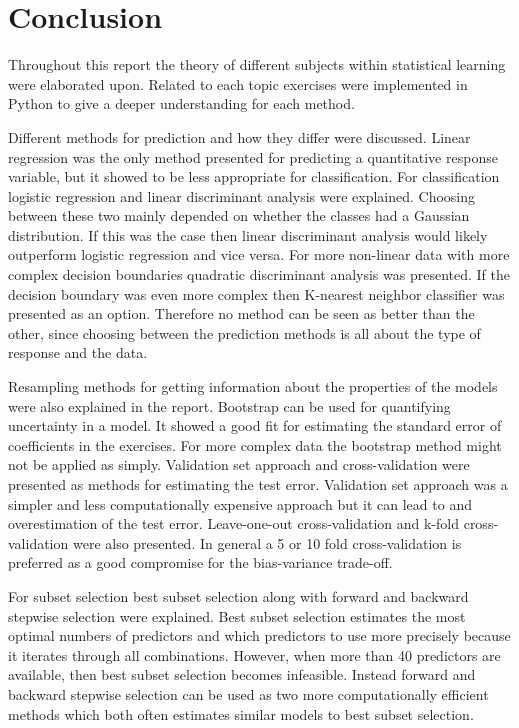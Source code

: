 \chapter{Conclusion}
\label{chp:conc}

Throughout this report the theory of different subjects within statistical learning were elaborated upon. Related to each topic exercises were implemented in Python to give a deeper understanding for each method. 

Different methods for prediction and how they differ were discussed. Linear regression was the only method presented for predicting a quantitative response variable, but it showed to be less appropriate for classification. For classification logistic regression and linear discriminant analysis were explained. Choosing between these two mainly depended on whether the classes had a Gaussian distribution. If this was the case then linear discriminant analysis would likely outperform logistic regression and vice versa. For more non-linear data with more complex decision boundaries quadratic discriminant analysis was presented. If the decision boundary was even more complex then K-nearest neighbor classifier was presented as an option. Therefore no method can be seen as better than the other, since choosing between the prediction methods is all about the type of response and the data.

Resampling methods for getting information about the properties of the models were also explained in the report. Bootstrap can be used for quantifying uncertainty in a model. It showed a good fit for estimating the standard error of coefficients in the exercises. For more complex data the bootstrap method might not be applied as simply.
Validation set approach and cross-validation were presented as methods for estimating the test error. Validation set approach was a simpler and less computationally expensive approach but it can lead to and overestimation of the test error. Leave-one-out cross-validation and k-fold cross-validation were also presented. In general a 5 or 10 fold cross-validation is preferred as a good compromise for the bias-variance trade-off.

For subset selection best subset selection along with forward and backward stepwise selection were explained. Best subset selection estimates the most optimal numbers of predictors and which predictors to use more precisely because it iterates through all combinations. However, when more than 40 predictors are available, then best subset selection becomes infeasible. Instead forward and backward stepwise selection can be used as two more computationally efficient methods which both often estimates similar models to best subset selection. 

